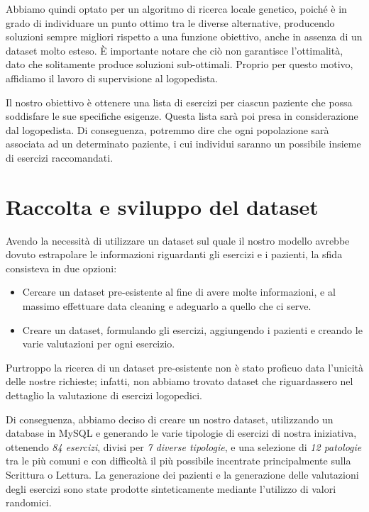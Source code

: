\documentclass{article}
\begin{document}
    Abbiamo quindi optato per un algoritmo di ricerca locale genetico, poiché è in grado di individuare un punto ottimo tra le diverse alternative, producendo
    soluzioni sempre migliori rispetto a una funzione obiettivo, anche in assenza di un dataset molto esteso. È importante notare che ciò non garantisce l'ottimalità,
    dato che solitamente produce soluzioni sub-ottimali. Proprio per questo motivo, affidiamo il lavoro di supervisione al logopedista.

    Il nostro obiettivo è ottenere una lista di esercizi per ciascun paziente che possa soddisfare le sue specifiche esigenze. Questa lista sarà poi presa in
    considerazione dal logopedista. Di conseguenza, potremmo dire che ogni popolazione sarà associata ad un determinato
    paziente, i cui individui saranno un possibile insieme di esercizi raccomandati.

    \section{Raccolta e sviluppo del dataset}

    Avendo la necessità di utilizzare un dataset sul quale il nostro modello avrebbe dovuto estrapolare le informazioni riguardanti gli esercizi e i pazienti, la sfida consisteva in due opzioni:

    \begin{itemize}
        \item Cercare un dataset pre-esistente al fine di avere molte informazioni, e al massimo effettuare data cleaning e adeguarlo a quello che ci serve.
        \item Creare un dataset, formulando gli esercizi, aggiungendo i pazienti e creando le varie valutazioni per ogni esercizio.
    \end{itemize}

    Purtroppo la ricerca di un dataset pre-esistente non è stato proficuo data l'unicità delle nostre richieste; infatti, non abbiamo trovato dataset che riguardassero nel dettaglio la valutazione di esercizi logopedici.

    Di conseguenza, abbiamo deciso di creare un nostro dataset, utilizzando un database in MySQL e generando le varie tipologie di esercizi di nostra iniziativa, ottenendo \textit{84 esercizi}, divisi per \textit{7 diverse tipologie}, e una selezione di \textit{12 patologie} tra le più comuni e con difficoltà il più possibile incentrate principalmente sulla Scrittura o Lettura. La generazione dei pazienti e la generazione delle valutazioni degli esercizi sono state prodotte sinteticamente mediante l'utilizzo di valori randomici.
\end{document}
